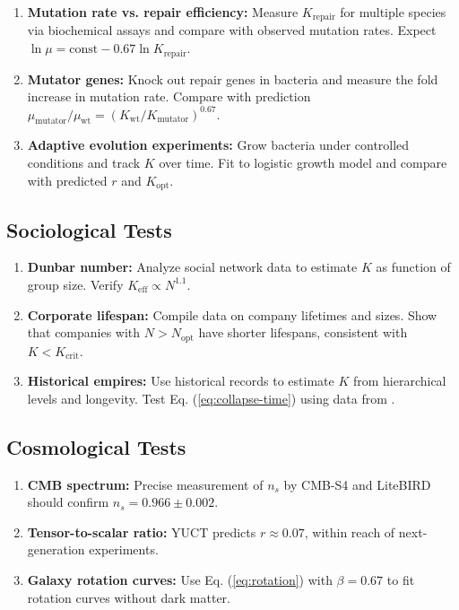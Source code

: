 \documentclass[12pt,a4paper]{article}
\theoremstyle{remark}
\newcommand{\Keff}{K_{\mathrm{eff}}}
\begin{document}
	\begin{enumerate}
		\item \textbf{Mutation rate vs. repair efficiency:} Measure $K_{\text{repair}}$ for multiple species via biochemical assays and compare with observed mutation rates. Expect $\ln \mu = \text{const} - 0.67 \ln K_{\text{repair}}$.
		\item \textbf{Mutator genes:} Knock out repair genes in bacteria and measure the fold increase in mutation rate. Compare with prediction $\mu_{\text{mutator}}/\mu_{\text{wt}} = (K_{\text{wt}}/K_{\text{mutator}})^{0.67}$.
		\item \textbf{Adaptive evolution experiments:} Grow bacteria under controlled conditions and track $K$ over time. Fit to logistic growth model and compare with predicted $r$ and $K_{\text{opt}}$.
	\end{enumerate}
	
	\subsection{Sociological Tests}
	
	\begin{enumerate}
		\item \textbf{Dunbar number:} Analyze social network data to estimate $K$ as function of group size. Verify $\Keff \propto N^{1.1}$.
		\item \textbf{Corporate lifespan:} Compile data on company lifetimes and sizes. Show that companies with $N > N_{\text{opt}}$ have shorter lifespans, consistent with $K < K_{\text{crit}}$.
		\item \textbf{Historical empires:} Use historical records to estimate $K$ from hierarchical levels and longevity. Test Eq. (\ref{eq:collapse-time}) using data from \cite{TurchinNefedov2009}.
	\end{enumerate}
	
	\subsection{Cosmological Tests}
	
	\begin{enumerate}
		\item \textbf{CMB spectrum:} Precise measurement of $n_s$ by CMB-S4 and LiteBIRD should confirm $n_s = 0.966 \pm 0.002$.
		\item \textbf{Tensor-to-scalar ratio:} YUCT predicts $r \approx 0.07$, within reach of next-generation experiments.
		\item \textbf{Galaxy rotation curves:} Use Eq. (\ref{eq:rotation}) with $\beta = 0.67$ to fit rotation curves without dark matter.
	\end{enumerate}
	
\end{document}
